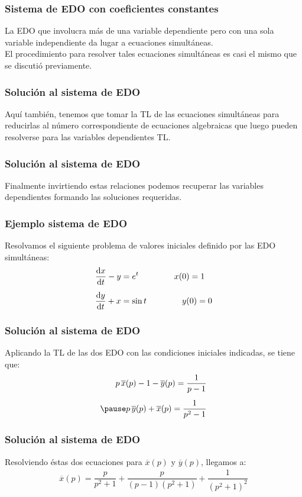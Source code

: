 \begin{frame}
\frametitle{Sistema de EDO con coeficientes constantes}
La EDO que involucra más de una variable dependiente pero con una sola variable independiente da lugar a ecuaciones simultáneas.
\\
\bigskip
\pause
El procedimiento para resolver tales ecuaciones simultáneas es casi el mismo que se discutió previamente. 
\end{frame}
\begin{frame}
\frametitle{Solución al sistema de EDO}
Aquí también, tenemos que tomar la TL de las ecuaciones simultáneas para reducirlas al número correspondiente de ecuaciones algebraicas que luego pueden resolverse para las variables dependientes TL.
\end{frame}
\begin{frame}
\frametitle{Solución al sistema de EDO}
Finalmente invirtiendo estas relaciones podemos recuperar las variables dependientes formando las soluciones requeridas.
\end{frame}
\begin{frame}
\frametitle{Ejemplo sistema de EDO}
Resolvamos el siguiente problema de valores iniciales definido por las EDO simultáneas:
\pause
\begin{align*}
\dv{x}{t} - y &= e^{t} \hspace{1.5cm} x(0) =  1 \\[0.5em]
\dv{y}{t} + x &= \sin t \hspace{1.5cm} y(0) =  0
\end{align*}
\end{frame}
\begin{frame}
\frametitle{Solución al sistema de EDO}
Aplicando la TL de las dos EDO con las condiciones iniciales indicadas, se tiene que:
\pause
\begin{eqnarray*}
\begin{aligned}
p \, \overline{x} (p) - 1 - \overline{y} (p) = \dfrac{1}{p -1} \\[0.5em] \pause
p \, \overline{y} (p) + \overline{x} (p) = \dfrac{1}{p^{2} -1}
\end{aligned}
\end{eqnarray*}
\end{frame}
\begin{frame}
\frametitle{Solución al sistema de EDO}
Resolviendo éstas dos ecuaciones para $\overline{x}(p)$ y $\overline{y}(p)$, llegamos a:
\pause
\begin{align*}
\overline{x}(p) = \dfrac{p}{p^{2} + 1} + \dfrac{p}{(p - 1)(p^{2} + 1)} + \dfrac{1}{(p^{2} + 1)^{2}}
\end{align*}
\end{frame}
